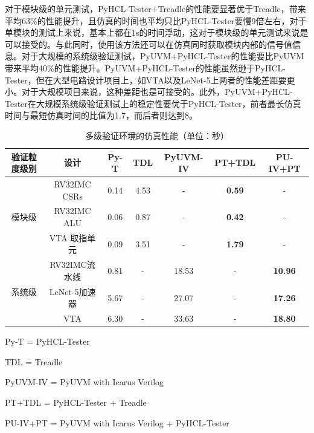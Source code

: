 对于模块级的单元测试，PyHCL-Tester+Treadle的性能要显著优于Treadle，带来平均63\%的性能提升，且仿真的时间也平均只比PyHCL-Tester要慢9倍左右，对于单模块的测试上来说，基本上都在1s的时间浮动，这对于模块级的单元测试来说是可以接受的。与此同时，使用该方法还可以在仿真同时获取模块内部的信号值信息。对于大规模的系统级验证测试，PyUVM+PyHCL-Tester的性能要比PyUVM带来平均40\%的性能提升。PyUVM+PyHCL-Tester的性能虽然逊于PyHCL-Tester，但在大型电路设计项目上，如VTA以及LeNet-5上两者的性能差距要更小。对于大规模项目来说，这种差距也是可接受的。此外，PyUVM+PyHCL-Tester在大规模系统级验证测试上的稳定性要优于PyHCL-Tester，前者最长仿真时间与最短仿真时间的比值为1.7，而后者则达到8。

\begin{table}
	\centering
	\caption{多级验证环境的仿真性能（单位：秒）}
	\begin{tabular}{ccccccc}
		\toprule
		验证粒度级别 & 设计 & Py-T & TDL & PyUVM-IV & PT+TDL & PU-IV+PT\\
		\midrule
		\multirow{3}[1]{*}{模块级} & RV32IMC CSRs & 0.14  & 4.53  & -     & \textbf{0.59 } & - \\
		& RV32IMC ALU & 0.06  & 0.87  & -     & \textbf{0.42 } & - \\
		& VTA 取指单元 & 0.09  & 3.51  & -     & \textbf{1.79 } & - \\
		\midrule
		\multirow{3}[1]{*}{系统级} & RV32IMC流水线 & 0.81  & -     & 18.53  & -     & \textbf{10.96 } \\
		& LeNet-5加速器 & 5.67  & -     & 27.07  & -     & \textbf{17.26 } \\
		& VTA   & 6.30  & -     & 33.63  & -     & \textbf{18.80 } \\
		\bottomrule
	\end{tabular}%

\begin{threeparttable}
	\begin{tablenotes}
		\linespread{1.4}
		\footnotesize
		\item Py-T = PyHCL-Tester
		\item TDL = Treadle
		\item PyUVM-IV = PyUVM with Icarus Verilog
		\item PT+TDL = PyHCL-Tester + Treadle
		\item PU-IV+PT = PyUVM with Icarus Verilog + PyHCL-Tester
	\end{tablenotes}
\end{threeparttable}
\end{table}%

